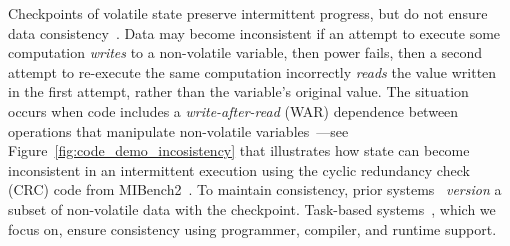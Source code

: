 
Checkpoints of volatile state preserve intermittent progress, but do not ensure data consistency~\cite{dino,chain,ratchet}. Data may become inconsistent if an attempt to execute some computation {\em writes} to a non-volatile variable, then power fails, then a second attempt to re-execute the same computation incorrectly {\em reads} the value written in the first attempt, rather than the variable's original value. The situation occurs when code includes a \emph{write-after-read} (WAR) dependence between operations that manipulate non-volatile variables~\cite{ratchet,dino,alpaca}---see Figure~\ref{fig:code_demo_incosistency} that illustrates how state can become inconsistent in an intermittent execution using the cyclic redundancy check (CRC) code from MIBench2~\cite{hicks_mibench2_2016}.
To maintain consistency, prior systems~\cite{dino,ratchet} {\em version} a subset of non-volatile data with the checkpoint. Task-based systems~\cite{chain,alpaca}, which we focus on, ensure consistency using programmer, compiler, and runtime support.

